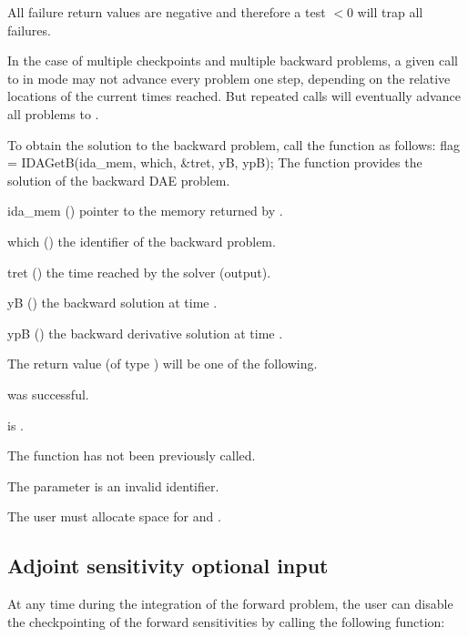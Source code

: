 {
  All failure return values are negative and therefore a test $< 0$
  will trap all  failures.

  In the case of multiple checkpoints and multiple backward problems, a given
  call to  in  mode may not advance every problem
  one step, depending on the relative locations of the current times reached.
  But repeated calls will eventually advance all problems to .
}
To obtain the solution  to the backward problem, call the function
 as follows:
{
  flag = IDAGetB(ida\_mem, which, \&tret, yB, ypB);
}
{
  The function  provides the solution  of the backward DAE
  problem.
}
{
  \begin{args}
  \item[ida\_mem] ()
    pointer to the {\idas} memory returned by .
  \item[which] ()
    the identifier of the backward problem.
  \item[tret] ()
    the time reached by the solver (output).
  \item[yB] ()
    the backward solution at time .
  \item[ypB] ()
    the backward derivative solution at time .
  \end{args}
}
{
  The return value  (of type ) will be one of the following.
  \begin{args}
  \item[\Id{IDA\_SUCCESS}] 
     was successful.
  \item[\Id{IDA\_MEM\_NULL}] 
     is .
  \item[\Id{IDA\_NO\_ADJ}]
    The function  has not been previously called.
   \item[\Id{IDA\_ILL\_INPUT}]
    The parameter  is an invalid identifier.
  \end{args} 
}
{
  {\warn} The user must allocate space for  and .
}


\subsection{Adjoint sensitivity optional input}

At any time during the integration of the forward problem, the user
can disable the checkpointing of the forward sensitivities by calling
the following function:


